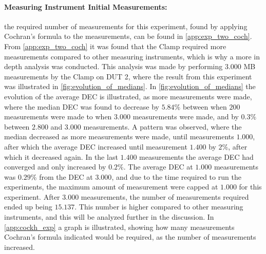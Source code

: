 \paragraph{Measuring Instrument Initial Measurements:} the required number of measurements for this experiment, found by applying Cochran's formula to the measurements, can be found in \cref{app:exp_two_coch}. %
From \cref{app:exp_two_coch} it was found that the Clamp required more measurements compared to other measuring instruments, which is why a more in depth analysis was conducted. This analysis was made by performing $3.000$ MB measurements by the Clamp on DUT 2, where the result from this experiment was illustrated in \cref{fig:evolution_of_medians}. In \cref{fig:evolution_of_medians} the evolution of the average DEC is illustrated, as more measurements were made, where the median DEC was found to decrease by $5.84\%$ between when $200$ measurements were made to when $3.000$ measurements were made, and by $0.3\%$ between $2.800$ and $3.000$ measurements. A pattern was observed, where the median decreased as more measurements were made, until measurements $1.000$, after which the average DEC increased until measurement $1.400$ by $2\%$, after which it decreased again. In the last $1.400$ measurements the average DEC had converged and only increased by $0.2\%$. The average DEC at $1.000$ measurements was $0.29\%$ from the DEC at $3.000$, and due to the time required to run the experiments, the maximum amount of measurement were capped at $1.000$ for this experiment. After $3.000$ measurements, the number of measurements required ended up being $15.137$. This number is higher compared to other measuring instruments, and this will be analyzed further in the discussion. In \cref{app:cockh_exp} a graph is illustrated, showing how many measurements Cochran's formula indicated would be required, as the number of measurements increased. 




